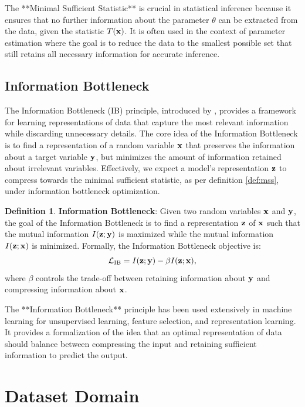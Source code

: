 \documentclass[11pt, oneside]{book}
\theoremstyle{plain}
\theoremstyle{definition}
\newtheorem{definition}[theorem]{Definition}
\theoremstyle{remark}
\begin{document}
The **Minimal Sufficient Statistic** is crucial in statistical inference because it ensures that no further information about the parameter $\theta$ can be extracted from the data, given the statistic $T({\mathbf{x}})$. It is often used in the context of parameter estimation where the goal is to reduce the data to the smallest possible set that still retains all necessary information for accurate inference.

\subsection{Information Bottleneck}

The Information Bottleneck (IB) principle, introduced by \cite{tishby2000information}, provides a framework for learning representations of data that capture the most relevant information while discarding unnecessary details. The core idea of the Information Bottleneck is to find a representation of a random variable ${\mathbf{x}}$ that preserves the information about a target variable ${\mathbf{y}}$, but minimizes the amount of information retained about irrelevant variables. Effectively, we expect a model's representation ${\mathbf{z}}$ to compress towards the minimal sufficient statistic, as per definition \ref{def:mss}, under information bottleneck optimization.

\begin{definition}
\textbf{Information Bottleneck}: Given two random variables ${\mathbf{x}}$ and ${\mathbf{y}}$, the goal of the Information Bottleneck is to find a representation ${\mathbf{z}}$ of ${\mathbf{x}}$ such that the mutual information $I({\mathbf{z}}; {\mathbf{y}})$ is maximized while the mutual information $I({\mathbf{z}}; {\mathbf{x}})$ is minimized. Formally, the Information Bottleneck objective is:
\[
\mathcal{L}_{\text{IB}} = I({\mathbf{z}}; {\mathbf{y}}) - \beta I({\mathbf{z}}; {\mathbf{x}}),
\]
where $\beta$ controls the trade-off between retaining information about ${\mathbf{y}}$ and compressing information about ${\mathbf{x}}$.
\label{def:ib}
\end{definition}

The **Information Bottleneck** principle has been used extensively in machine learning for unsupervised learning, feature selection, and representation learning. It provides a formalization of the idea that an optimal representation of data should balance between compressing the input and retaining sufficient information to predict the output.

\section{Dataset Domain}
\end{document}
